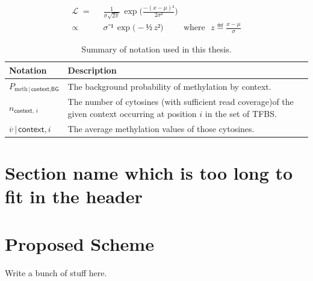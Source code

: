 \documentclass[BibLaTeXsortingNone]{PHlab-thesis}
\begin{document}
\begin{align*}
  ℒ  \;= & \;\;  \frac{1}{σ\sqrt{2π}}\, \exp\Big( \frac{-(x-μ)²}{2σ²}\Big)              \\[.5ex]%
  ∝      & \;\;  σ⁻¹\, \exp\big( -½\,z²)  \hspace{1cm} \text{where~~} z ≝ \frac{x-μ}{σ}
\end{align*}


\begin{table}
  \begin{tabularx}{0.9\linewidth}{lX}
    Notation                                            & Description                                                                                                                        \\
    \toprule
    $P_{\text{meth}\,|\,\textsf{context,BG}}$           & The background probability of methylation by context.                                                                              \\[.3ex]
    $n_{\textsf{context},\,i}$                          & The number of cytosines (with sufficient read coverage)\newline of the given context occurring at position $i$ in the set of TFBS. \\[.3ex]
    $\overline{v}\,|\,\scriptstyle{\textsf{context},i}$ & The average methylation values of those cytosines.                                                                                 \\
    \bottomrule
  \end{tabularx}
  \caption{Summary of notation used in this thesis.}
  \label{tab:notation}
\end{table}


\section[Shorter Section Name]{Section name which is too long to fit in the header}


\section{Proposed Scheme}
Write a bunch of stuff here.
\end{document}
